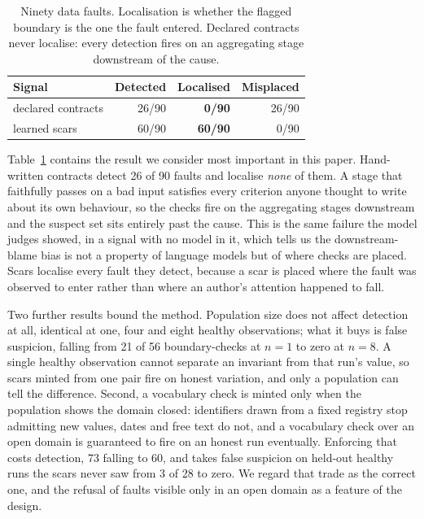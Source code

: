 \begin{table}[t]
\centering
\begin{tabular}{lrrr}
\toprule
Signal & Detected & Localised & Misplaced \\
\midrule
declared contracts & 26/90 & \textbf{0/90} & 26/90 \\
learned scars      & 60/90 & \textbf{60/90} & 0/90 \\
\bottomrule
\end{tabular}
\caption{Ninety data faults. Localisation is whether the flagged boundary is the one the
fault entered. Declared contracts never localise: every detection fires on an aggregating
stage downstream of the cause.}
\label{tab:scars}
\end{table}

Table~\ref{tab:scars} contains the result we consider most important in this paper.
Hand-written contracts detect 26 of 90 faults and localise \emph{none} of them. A stage
that faithfully passes on a bad input satisfies every criterion anyone thought to write
about its own behaviour, so the checks fire on the aggregating stages downstream and the
suspect set sits entirely past the cause. This is the same failure the model judges
showed, in a signal with no model in it, which tells us the downstream-blame bias is not a
property of language models but of where checks are placed. Scars localise every fault
they detect, because a scar is placed where the fault was observed to enter rather than
where an author's attention happened to fall.

Two further results bound the method. Population size does not affect detection at all,
identical at one, four and eight healthy observations; what it buys is false suspicion,
falling from 21 of 56 boundary-checks at $n=1$ to zero at $n=8$. A single healthy
observation cannot separate an invariant from that run's value, so scars minted from one
pair fire on honest variation, and only a population can tell the difference. Second, a
vocabulary check is minted only when the population shows the domain closed: identifiers
drawn from a fixed registry stop admitting new values, dates and free text do not, and a
vocabulary check over an open domain is guaranteed to fire on an honest run eventually.
Enforcing that costs detection, 73 falling to 60, and takes false suspicion on held-out
healthy runs the scars never saw from 3 of 28 to zero. We regard that trade as the correct
one, and the refusal of faults visible only in an open domain as a feature of the design.

